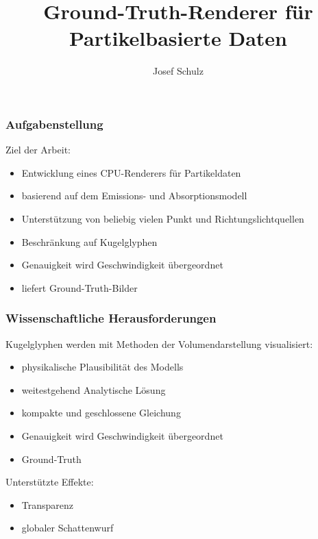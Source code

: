 \documentclass[xcolor=dvipsnames]{beamer}
\title{Ground-Truth-Renderer für Partikelbasierte Daten}
\author{Josef Schulz}
\institute{Technische Universität Dresden}
\begin{document}
\begin{frame}
	\maketitle
	\nocite*{}
	\thispagestyle{empty}
\end{frame}

\begin{frame}
	\frametitle{Aufgabenstellung}
	
	Ziel der Arbeit:	
	
	\vspace*{0.4cm}
	
	\begin{itemize}
		\setlength{\itemsep}{8pt}
		
		\item Entwicklung eines CPU-Renderers für Partikeldaten
		\item basierend auf dem Emissions- und Absorptionsmodell
		\item Unterstützung von beliebig vielen Punkt und Richtungslichtquellen
		\item Beschränkung auf Kugelglyphen
	\end{itemize}
	
	\vspace*{0.2cm}
	
	\begin{itemize}
		\item Genauigkeit wird Geschwindigkeit übergeordnet
		\item liefert Ground-Truth-Bilder
	\end{itemize}
\end{frame}

\begin{frame}
	\frametitle{Wissenschaftliche Herausforderungen}
	
	Kugelglyphen werden mit Methoden der Volumendarstellung visualisiert: 
	
	\begin{itemize}
		\setlength{\itemsep}{8pt}
	
		\item physikalische Plausibilität des Modells
		\item weitestgehend Analytische Lösung
		\item kompakte und geschlossene Gleichung
		\item Genauigkeit wird Geschwindigkeit übergeordnet
		\item Ground-Truth
	\end{itemize}
	
	\vspace*{0.4cm}
	
	Unterstützte Effekte:
	
	\begin{itemize}
		\item Transparenz
		\item globaler Schattenwurf
	\end{itemize}
\end{frame}
\end{document}
